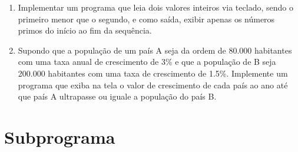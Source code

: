 \documentclass[11pt]{article}
\begin{document}
\begin{enumerate}
	\item  Implementar um programa que leia dois valores inteiros via teclado, sendo o primeiro menor que
	o segundo, e como saída, exibir apenas os números primos do início ao fim da sequência.
	
	\item Supondo que a população de um país A seja da ordem de 80.000 habitantes com uma taxa
	anual de crescimento de 3\% e que a população de B seja 200.000 habitantes com uma taxa de
	crescimento de 1.5\%. Implemente um programa que exiba na tela o valor de crescimento de cada
	país ao ano até que país A ultrapasse ou iguale a população do país B.
\end{enumerate}

\newpage

\section{Subprograma}
\end{document}
